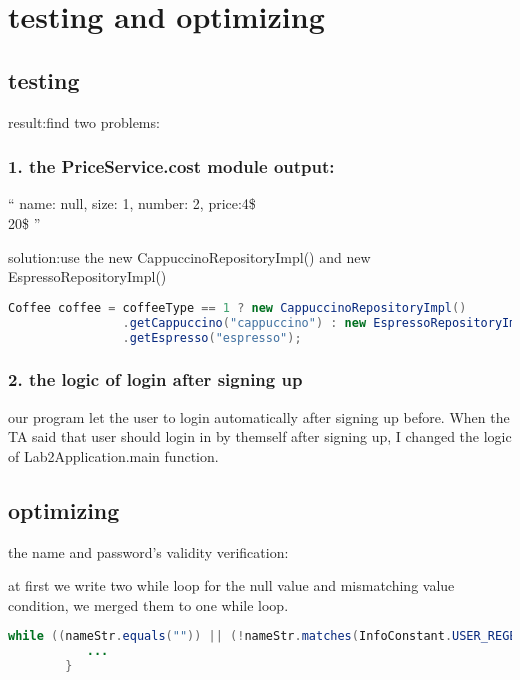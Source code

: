\documentclass[./report.tex]{subfiles}
\begin{document}
\section{testing and optimizing}
	\subsection{testing}
	\par result:find two problems: 
		\subsubsection{1. the PriceService.cost module output:}
		\par `` name: null, size: 1, number: 2, price:4\$ \\ 20\$  ''
		\par 	solution:use the new CappuccinoRepositoryImpl() and new EspressoRepositoryImpl()
		\par
  \begin{lstlisting}[language=java]
Coffee coffee = coffeeType == 1 ? new CappuccinoRepositoryImpl()
                .getCappuccino("cappuccino") : new EspressoRepositoryImpl()
                .getEspresso("espresso");
\end{lstlisting}
		\subsubsection{2. the logic of login after signing up}
		\par our program let the user to login automatically after signing up before. When the TA said that user should login in by themself after signing up, I changed the logic of Lab2Application.main function.

	\subsection{optimizing}
	\par the name and password's validity verification:
	\par at first we write two while loop  for the null value and mismatching value condition, we merged them to one while loop.
\begin{lstlisting}[language=java]
 while ((nameStr.equals("")) || (!nameStr.matches(InfoConstant.USER_REGEX))) {
           ...
        }
\end{lstlisting}
	
	

	
    
   

	
		
\end{document}
